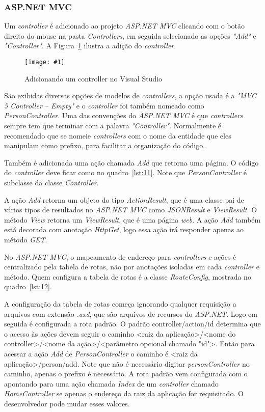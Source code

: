 \documentclass[a4paper,12pt]{article}
\newcommand{\figura}[3] {
	\begin{figure}[ht]
		\centering
		\texttt{[image: \#1]}
		\caption{#2}
		\label{#3}
	\end{figure}
	\FloatBarrier
}
\newcommand{\est}[1] {
\textit{#1}}
\newcommand{\classe}[1] {
\textit{#1}}
\newcommand{\arquivo}[1] {
\textit{#1}}
\newcommand{\lang}[1] {
\textit{#1}}
\newcommand{\annotation}[1] {
\textit{#1}}
\newcommand{\metodo}[1] {
\textit{#1}}
\newcommand{\sharpcode}[3] {
	
}
\begin{document}
\subsubsection{ASP.NET MVC}

Um \est{controller} é adicionado ao projeto \est{ASP.NET MVC} clicando com o botão direito do mouse na pasta \arquivo{Controllers}, em seguida selecionado as opções \est{"Add"} e \est{"Controller"}. A Figura~\ref{fig:25} ilustra a adição do \est{controller}.

\figura{25.png}{Adicionando um controller no Visual Studio}{fig:25}

São exibidas diversas opções de modelos de \est{controllers}, a opção usada é a \est{"MVC 5 Controller – Empty"} e o \est{controller} foi também nomeado como \classe{PersonController}. Uma das convenções do \est{ASP.NET MVC} é que \est{controllers} sempre tem que terminar com a palavra \est{"Controller"}. Normalmente é recomendado que se nomeie \est{controllers} com o nome da entidade que eles manipulam como prefixo, para facilitar a organização do código.

Também é adicionada uma ação chamada \metodo{Add} que retorna uma página. O código do \est{controller} deve ficar como no quadro~\ref{lst:11}. Note que \classe{PersonController} é subclasse da classe \classe{Controller}.

\sharpcode{code/11.txt}{\classe{PersonController} em \lang{C\#}}{lst:11}

A ação \metodo{Add} retorna um objeto do tipo \classe{ActionResult}, que é uma classe pai de vários tipos de resultados no \est{ASP.NET MVC} como \classe{JSONResult} e \classe{ViewResult}. O método \metodo{View} retorna um \classe{ViewResult}, que é uma página \est{web}. A ação \metodo{Add} também está decorada com anotação \annotation{HttpGet}, logo essa ação irá responder apenas ao método \est{GET}.

No \est{ASP.NET MVC}, o mapeamento de endereço para \est{controllers} e ações é centralizado pela tabela de rotas, não por anotações isoladas em cada \est{controller} e método. Quem configura a tabela de rotas é a classe \classe{RouteConfig}, mostrada no quadro~\ref{lst:12}.

\sharpcode{code/12.txt}{A classe \classe{RouteConfig}}{lst:12}

A configuração da tabela de rotas começa ignorando qualquer requisição a arquivos com extensão \arquivo{.axd}, que são arquivos de recursos do \est{ASP.NET}. Logo em seguida é configurada a rota padrão. O padrão {controller}/{action}/{id} determina que o acesso às ações devem seguir o caminho <raiz da aplicação>/<nome do controller>/<nome da ação>/<parâmetro opcional chamado "id">. Então para acessar a ação \metodo{Add} de \classe{PersonController} o caminho é <raiz da aplicação>/person/add. Note que não é necessário digitar \est{personController} no caminho, apenas o prefixo é necessário. A rota padrão vem configurada com o apontando para uma ação chamada \metodo{Index} de um \est{controller} chamado \classe{HomeController} se apenas o endereço da raiz da aplicação for requisitado. O desenvolvedor pode mudar esses valores. 
\end{document}

